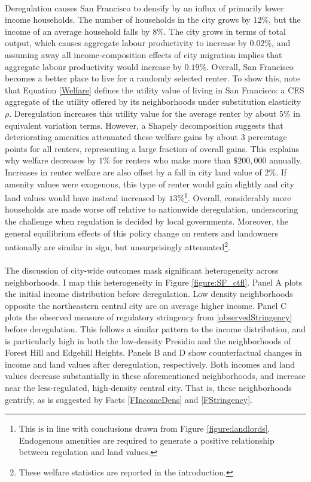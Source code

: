 \documentclass[12pt]{article}
\begin{document}
\paragraph*{}
 Deregulation causes San Francisco to densify by an influx of primarily lower income households. The number of households in the city grows by $12 \%$, but the income of an average household falls by $8 \%$.  The city grows in terms of total output, which causes aggregate labour productivity to increase by $0.02\%$, and assuming away all income-composition effects of city migration implies that aggregate labour productivity would increase by $0.19\%$. Overall, San Francisco becomes a better place to live for a randomly selected renter. To show this, note that Equation \eqref{Welfare} defines the utility value of living in San Francisco: a CES aggregate of the utility offered by its neighborhoods under substitution elasticity $\rho$. Deregulation increases this utility value for the average renter by about $5 \%$ in equivalent variation terms. However, a Shapely decomposition suggests that deteriorating amenities attenuated these welfare gains by about $3$ percentage points for all renters, representing a large fraction of overall gains. This explains why welfare decreases by $1 \%$ for renters who make more than $\$200,000$ annually. Increases in renter welfare are also offset by a fall in city land value of $2\%$. If amenity values were exogenous, this type of renter would gain slightly and city land values would have instead increased by $13 \%$\footnote{This is in line with conclusions drawn from Figure \ref{figure:landlords}. Endogenous amenities are required to generate a positive relationship between regulation and land values.}. Overall, considerably more households are made worse off relative to nationwide deregulation, underscoring the challenge when regulation is decided by local governments. Moreover, the general equilibrium effects of this policy change on renters and landowners nationally are similar in sign, but unsurprisingly attenuated\footnote{These welfare statistics are reported in the introduction.}.

\paragraph*{}
 The discussion of city-wide outcomes mask significant heterogeneity across neighborhoods. I map this heterogeneity in Figure \ref{figure:SF_ctfl}. Panel A plots the initial income distribution before deregulation. Low density neighborhoods opposite the northeastern central city are on average higher income. Panel C plots the observed measure of regulatory stringency from \eqref{observedStringency} before deregulation. This follows a similar pattern to the income distribution, and is particularly high in both the low-density Presidio and the neighborhoods of Forest Hill and Edgehill Heights. Panels B and D show counterfactual changes in income and land values after deregulation, respectively. Both incomes and land values decrease substantially in these aforementioned neighborhoods, and increase near the less-regulated, high-density central city. That is, these neighborhoods gentrify, as is suggested by Facts \ref{FIncomeDens} and \ref{FStringency}. 
\end{document}
